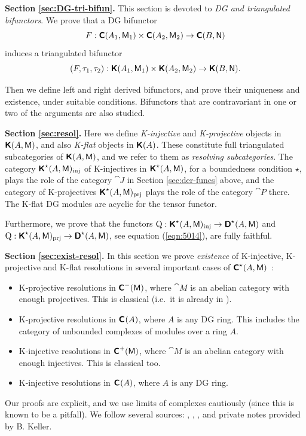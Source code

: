 \medskip \noindent 
{\bf Section \ref{sec:DG-tri-bifun}.}
This section is devoted to  {\em DG and triangulated bifunctors}. 
We prove that a DG bifunctor 
\[ F : \boldsymbol{\mathsf{C}}(A_1, \operatorname{\mathsf{M}}_1) \times \boldsymbol{\mathsf{C}}(A_2, \operatorname{\mathsf{M}}_2)
\to \boldsymbol{\mathsf{C}}(B, \operatorname{\mathsf{N}}) \]
induces a triangulated bifunctor 
\[ (F, \tau_1, \tau_2) :  \boldsymbol{\mathsf{K}}(A_1, \operatorname{\mathsf{M}}_1) \times 
\boldsymbol{\mathsf{K}}(A_2, \operatorname{\mathsf{M}}_2) \to \boldsymbol{\mathsf{K}}(B, \operatorname{\mathsf{N}}) . \]

Then we define left and right derived bifunctors, and prove their uniqueness 
and existence, under suitable conditions. Bifunctors that are contravariant in 
one or two of the arguments are also studied. 


\medskip \noindent 
{\bf Section \ref{sec:resol}.}
Here we define {\em K-injective} and {\em K-projective} objects in 
$\boldsymbol{\mathsf{K}}(A, \operatorname{\mathsf{M}})$, and also  {\em K-flat} objects in 
$\boldsymbol{\mathsf{K}}(A)$. These constitute full triangulated subcategories of
$\boldsymbol{\mathsf{K}}(A, \operatorname{\mathsf{M}})$, and we refer to them as {\em resolving subcategories}.
The category $\boldsymbol{\mathsf{K}}^{\star}(A, \operatorname{\mathsf{M}})_{\mathrm{inj}}$ of K-injectives in 
$\boldsymbol{\mathsf{K}}^{\star}(A, \operatorname{\mathsf{M}})$, for a boundedness condition $\star$, 
plays the role of the category $\cat{J}$ in Section \ref{sec:der-funcs} 
above, and the category of K-projectives 
$\boldsymbol{\mathsf{K}}^{\star}(A, \operatorname{\mathsf{M}})_{\mathrm{prj}}$ 
plays the role of the category $\cat{P}$ there.
The K-flat DG modules are acyclic for the tensor functor. 

Furthermore, we prove that the functors 
$\operatorname{Q} : \boldsymbol{\mathsf{K}}^{\star}(A, \operatorname{\mathsf{M}})_{\mathrm{inj}} \to 
\boldsymbol{\mathsf{D}}^{\star}(A, \operatorname{\mathsf{M}})$
and 
$\operatorname{Q} : \boldsymbol{\mathsf{K}}^{\star}(A, \operatorname{\mathsf{M}})_{\mathrm{prj}} \to 
\boldsymbol{\mathsf{D}}^{\star}(A, \operatorname{\mathsf{M}})$,
see equation (\ref{eqn:5014}), are fully faithful. 


\medskip \noindent 
{\bf Section \ref{sec:exist-resol}.}
In this section we prove {\em existence} of K-injective, K-projective and 
K-flat resolutions in several important cases of 
$\boldsymbol{\mathsf{C}}^{\star}(A, \operatorname{\mathsf{M}})$~:
\begin{itemize}
\item K-projective resolutions in $\boldsymbol{\mathsf{C}}^{-}(\operatorname{\mathsf{M}})$, where $\cat{M}$ is 
an abelian category with enough projectives. This is classical (i.e.\ it is 
already in \cite{RD}).  

\item K-projective resolutions in $\boldsymbol{\mathsf{C}}^{}(A)$, where $A$ is any DG ring. 
This includes the category of unbounded complexes of modules over a ring $A$. 

\item K-injective resolutions in $\boldsymbol{\mathsf{C}}^{+}(\operatorname{\mathsf{M}})$, where $\cat{M}$ is 
an abelian category with enough injectives. This is classical too. 

\item K-injective resolutions in $\boldsymbol{\mathsf{C}}^{}(A)$, where $A$ is any DG ring. 
\end{itemize}
Our proofs are explicit, and we use limits of complexes cautiously (since 
this is known to be a pitfall). We follow several sources: \cite{RD}, 
\cite{Spa}, \cite{Kel1}, \cite{KaSc1} and private notes provided by B. Keller.


